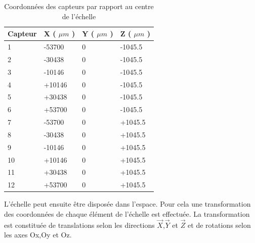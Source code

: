     \begin{table}[h]
    \footnotesize 
    \begin{center}
    \begin{tabular}{|l|l|l|l|} \hline
      Capteur & X ( $\mu m$ ) & Y ( $\mu m$ ) & Z ( $\mu m$ )\\ \hline
      1 & -53700 & 0 & -1045.5 \\ \hline
      2 & -30438 & 0 & -1045.5 \\ \hline
      3 & -10146 & 0 & -1045.5 \\ \hline
      4 & +10146 & 0 & -1045.5 \\ \hline
      5 & +30438 & 0 & -1045.5 \\ \hline
      6 & +53700 & 0 & -1045.5 \\ \hline
      7 & -53700 & 0 & +1045.5 \\ \hline
      8 & -30438 & 0 & +1045.5\\ \hline
      9 & -10146 & 0 & +1045.5\\ \hline
      10 & +10146 & 0 & +1045.5\\ \hline
      11 & +30438 & 0 & +1045.5\\ \hline
      12 & +53700 & 0 & +1045.5\\ \hline
    \end{tabular}
    \caption{Coordonn\'ees des capteurs par rapport au centre de l'\'echelle}
    \label{tab:coordCapteurPLUME}
    \end{center}
    \end{table}
    
   L'\'echelle peut ensuite \^etre dispos\'ee dans l'espace. Pour cela une transformation des coordonn\'ees de chaque \'el\'ement de l'\'echelle est effectu\'ee. La transformation est constitu\'ee de translations selon les directions $\overrightarrow{X}$,$\overrightarrow{Y}$ et $\overrightarrow{Z}$ et de rotations selon les axes Ox,Oy et Oz. 
   
   
   
